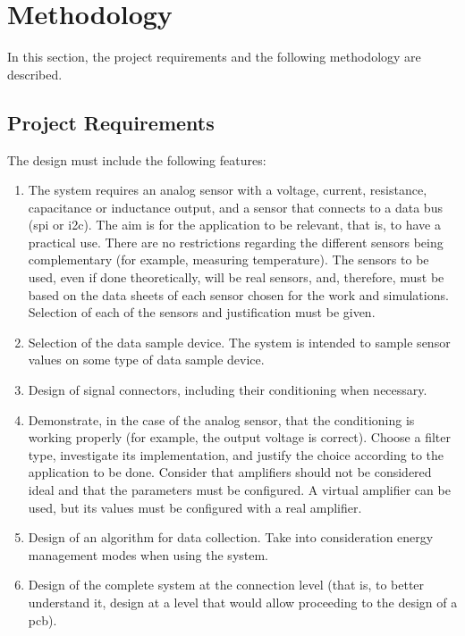 \section{Methodology}
\label{sec:methodology}
\hspace{12pt}
In this section, the project requirements and the following methodology are described.

\subsection{Project Requirements}
\label{sec:methodology:project_reqs}
\hspace{8pt}

The design must include the following features:

\begin{enumerate}
    \item The system requires an analog sensor with a voltage, current, resistance, capacitance or inductance output, and a sensor that connects to a data bus (\acrfull{spi} or \acrfull{i2c}). The aim is for the application to be relevant, that is, to have a practical use. There are no restrictions regarding the different sensors being complementary (for example, measuring temperature). The sensors to be used, even if done theoretically, will be real sensors, and, therefore, must be based on the data sheets of each sensor chosen for the work and simulations. Selection of each of the sensors and justification must be given.

    \item Selection of the data sample device. The system is intended to sample sensor values on some type of data sample device.

    \item Design of signal connectors, including their conditioning when necessary.

    \item Demonstrate, in the case of the analog sensor, that the conditioning is working properly (for example, the output voltage is correct). Choose a filter type, investigate its implementation, and justify the choice according to the application to be done. Consider that amplifiers should not be considered ideal and that the parameters must be configured. A virtual amplifier can be used, but its values must be configured with a real amplifier.

    \item Design of an algorithm for data collection. Take into consideration energy management modes when using the system.

    \item Design of the complete system at the connection level (that is, to better understand it, design at a level that would allow proceeding to the design of a \acrfull{pcb}).
\end{enumerate}


